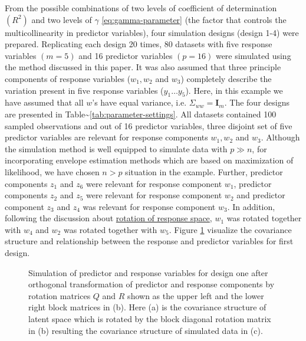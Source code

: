 \documentclass[review]{elsarticle}
\theoremstyle{definition}
\theoremstyle{definition}
\theoremstyle{definition}
\theoremstyle{remark}
\begin{document}
From the possible combinations of two levels of coefficient of
determination \((R^2)\) and two levels of \(\gamma\)
\eqref{eq:gamma-parameter} (the factor that controls the multicollinearity
in predictor variables), four simulation designs (design 1-4) were
prepared. Replicating each design 20 times, 80 datasets with five
response variables \((m=5)\) and 16 predictor variables \((p = 16)\)
were simulated using the method discussed in this paper. It was also
assumed that three principle components of response variables
(\(w_1, w_2\) and \(w_3\)) completely describe the variation present in
five response variables (\(y_1 \ldots y_5\)). Here, in this example we
have assumed that all \(w\)'s have equal variance, i.e.
\(\Sigma_{ww} = \mathbf{I}_m\). The four designs are presented in
Table\textasciitilde{}\ref{tab:parameter-settings}. All datasets
contained 100 sampled observations and out of 16 predictor variables,
three disjoint set of five predictor variables are relevant for response
components \(w_1, w_2\) and \(w_3\). Although the simulation method is
well equipped to simulate data with \(p \gg n\), for incorporating
envelope estimation methods which are based on maximization of
likelihood, we have chosen \(n > p\) situation in the example. Further,
predictor components \(z_1\) and \(z_6\) were relevant for response
component \(w_1\), predictor components \(z_2\) and \(z_5\) were
relevant for response component \(w_2\) and predictor component \(z_3\)
and \(z_4\) was relevant for response component \(w_3\). In addition,
following the discussion about
\protect\hyperlink{rotation-of-response-space}{rotation of response
space}, \(w_1\) was rotated together with \(w_4\) and \(w_2\) was
rotated together with \(w_5\). Figure \ref{fig:cov-plot-print-1}
visualize the covariance structure and relationship between the response
and predictor variables for first design.








\begin{figure}[!htb]
\caption{Simulation of predictor and response variables for design
one after orthogonal transformation of predictor and response components
by rotation matrices \(Q\) and \(R\) shown as the upper left and the
lower right block matrices in (b). Here (a) is the covariance structure
of latent space which is rotated by the block diagonal rotation matrix
in (b) resulting the covariance structure of simulated data in (c).}\label{fig:cov-plot-print-1}
\end{figure}
\end{document}
